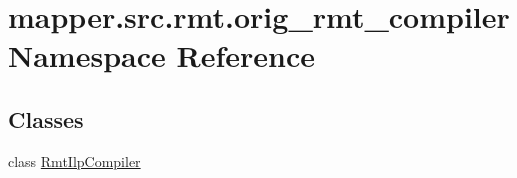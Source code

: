 \hypertarget{namespacemapper_1_1src_1_1rmt_1_1orig__rmt__compiler}{}\section{mapper.\+src.\+rmt.\+orig\+\_\+rmt\+\_\+compiler Namespace Reference}
\label{namespacemapper_1_1src_1_1rmt_1_1orig__rmt__compiler}
\subsection*{Classes}
\begin{DoxyCompactItemize}
\item 
class \hyperlink{classmapper_1_1src_1_1rmt_1_1orig__rmt__compiler_1_1_rmt_ilp_compiler}{Rmt\+Ilp\+Compiler}
\end{DoxyCompactItemize}
